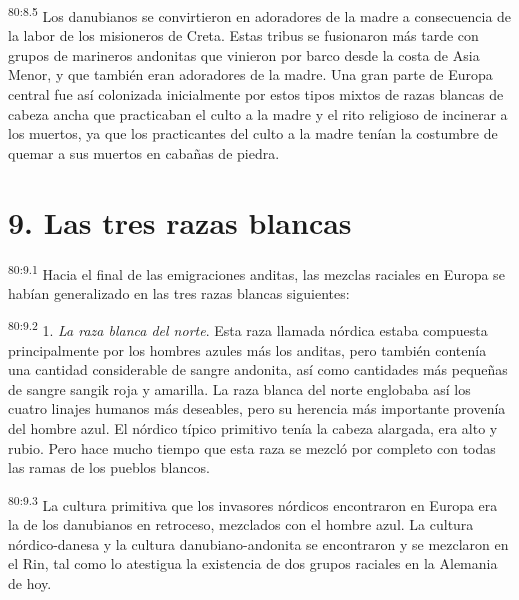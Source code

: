 \par
\textsuperscript{80:8.5} Los danubianos se convirtieron en adoradores de la madre a consecuencia de la labor de los misioneros de Creta. Estas tribus se fusionaron más tarde con grupos de marineros andonitas que vinieron por barco desde la costa de Asia Menor, y que también eran adoradores de la madre. Una gran parte de Europa central fue así colonizada inicialmente por estos tipos mixtos de razas blancas de cabeza ancha que practicaban el culto a la madre y el rito religioso de incinerar a los muertos, ya que los practicantes del culto a la madre tenían la costumbre de quemar a sus muertos en cabañas de piedra.

\section*{9. Las tres razas blancas}
\par
\textsuperscript{80:9.1} Hacia el final de las emigraciones anditas, las mezclas raciales en Europa se habían generalizado en las tres razas blancas siguientes:

\par
\textsuperscript{80:9.2} 1. \textit{La raza blanca del norte}. Esta raza llamada nórdica estaba compuesta principalmente por los hombres azules más los anditas, pero también contenía una cantidad considerable de sangre andonita, así como cantidades más pequeñas de sangre sangik roja y amarilla. La raza blanca del norte englobaba así los cuatro linajes humanos más deseables, pero su herencia más importante provenía del hombre azul. El nórdico típico primitivo tenía la cabeza alargada, era alto y rubio. Pero hace mucho tiempo que esta raza se mezcló por completo con todas las ramas de los pueblos blancos.

\par
\textsuperscript{80:9.3} La cultura primitiva que los invasores nórdicos encontraron en Europa era la de los danubianos en retroceso, mezclados con el hombre azul. La cultura nórdico-danesa y la cultura danubiano-andonita se encontraron y se mezclaron en el Rin, tal como lo atestigua la existencia de dos grupos raciales en la Alemania de hoy.

